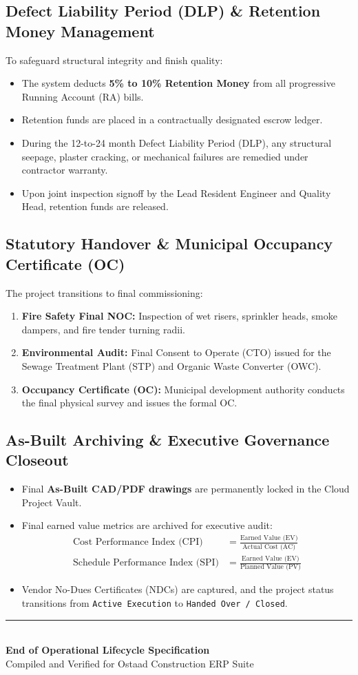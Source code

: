 \documentclass[11pt,a4paper]{article}
\begin{document}
\subsection{Defect Liability Period (DLP) \& Retention Money Management}
To safeguard structural integrity and finish quality:
\begin{itemize}[noitemsep]
    \item The system deducts \textbf{5\% to 10\% Retention Money} from all progressive Running Account (RA) bills.
    \item Retention funds are placed in a contractually designated escrow ledger.
    \item During the 12-to-24 month Defect Liability Period (DLP), any structural seepage, plaster cracking, or mechanical failures are remedied under contractor warranty.
    \item Upon joint inspection signoff by the Lead Resident Engineer and Quality Head, retention funds are released.
\end{itemize}

\subsection{Statutory Handover \& Municipal Occupancy Certificate (OC)}
The project transitions to final commissioning:
\begin{enumerate}[noitemsep]
    \item \textbf{Fire Safety Final NOC:} Inspection of wet risers, sprinkler heads, smoke dampers, and fire tender turning radii.
    \item \textbf{Environmental Audit:} Final Consent to Operate (CTO) issued for the Sewage Treatment Plant (STP) and Organic Waste Converter (OWC).
    \item \textbf{Occupancy Certificate (OC):} Municipal development authority conducts the final physical survey and issues the formal OC.
\end{enumerate}

\subsection{As-Built Archiving \& Executive Governance Closeout}
\begin{itemize}[noitemsep]
    \item Final \textbf{As-Built CAD/PDF drawings} are permanently locked in the Cloud Project Vault.
    \item Final earned value metrics are archived for executive audit:
    \begin{align}
        \text{Cost Performance Index (CPI)} &= \frac{\text{Earned Value (EV)}}{\text{Actual Cost (AC)}} \\
        \text{Schedule Performance Index (SPI)} &= \frac{\text{Earned Value (EV)}}{\text{Planned Value (PV)}}
    \end{align}
    \item Vendor No-Dues Certificates (NDCs) are captured, and the project status transitions from \texttt{Active Execution} to \texttt{Handed Over / Closed}.
\end{itemize}

\vfill
\begin{center}
    \rule{0.6\textwidth}{0.6pt}\\[0.4em]
    {\footnotesize \textbf{End of Operational Lifecycle Specification}}\\[0.2em]
    {\scriptsize Compiled and Verified for Ostaad Construction ERP Suite}
\end{center}
\end{document}
